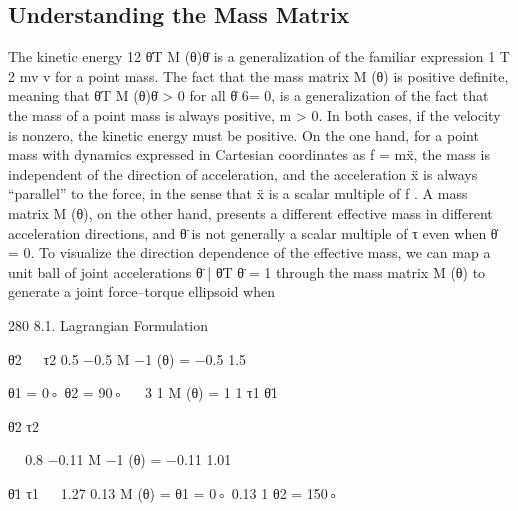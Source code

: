 \documentclass[12pt,a4paper]{article}
\begin{document}
\subsection{Understanding the Mass Matrix}
The kinetic energy 12 θ̇T M (θ)θ̇ is a generalization of the familiar expression
1    T
2 mv v for a point mass. The fact that the mass matrix M (θ) is positive
definite, meaning that θ̇T M (θ)θ̇ > 0 for all θ̇ 6= 0, is a generalization of the fact
that the mass of a point mass is always positive, m > 0. In both cases, if the
velocity is nonzero, the kinetic energy must be positive.
    On the one hand, for a point mass with dynamics expressed in Cartesian
coordinates as f = mẍ, the mass is independent of the direction of acceleration,
and the acceleration ẍ is always “parallel” to the force, in the sense that ẍ
is a scalar multiple of f . A mass matrix M (θ), on the other hand, presents a
different effective mass in different acceleration directions, and θ̈ is not generally
a scalar multiple of τ even when θ̇ = 0. To visualize the direction dependence
of the effective mass, we can map a unit ball of joint accelerations {θ̈ | θ̈T θ̈ = 1}
through the mass matrix M (θ) to generate a joint force–torque ellipsoid when


280                                                                       8.1. Lagrangian Formulation

           θ̈2                                                              τ2
                                                           0.5 −0.5
                                        M −1 (θ) =
                                                           −0.5 1.5

                         θ1 = 0◦
                         θ2 = 90◦                           
                                                       3 1
                                         M (θ) =
                                                       1 1                                      τ1
                                  θ̈1

           θ̈2
                                                                              τ2

                                                                         
                                                            0.8  −0.11
                                        M −1 (θ) =
                                                           −0.11 1.01

                                  θ̈1
                                                                                                τ1
                                                                 
                                                      1.27    0.13
                                        M (θ) =
                         θ1 = 0◦                      0.13      1
                         θ2 = 150◦
\end{document}
